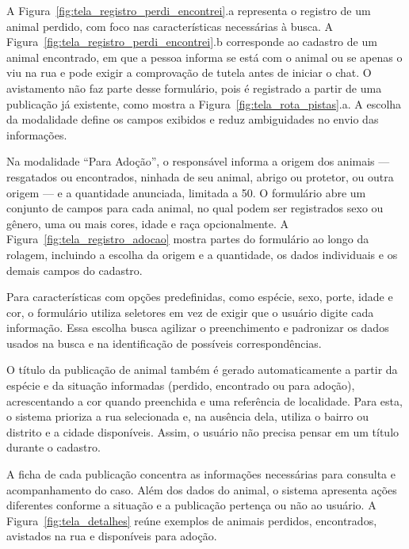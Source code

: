 A Figura~\ref{fig:tela_registro_perdi_encontrei}.a representa o registro de um animal perdido, com foco nas características necessárias à busca. A Figura~\ref{fig:tela_registro_perdi_encontrei}.b corresponde ao cadastro de um animal encontrado, em que a pessoa informa se está com o animal ou se apenas o viu na rua e pode exigir a comprovação de tutela antes de iniciar o chat. O avistamento não faz parte desse formulário, pois é registrado a partir de uma publicação já existente, como mostra a Figura~\ref{fig:tela_rota_pistas}.a. A escolha da modalidade define os campos exibidos e reduz ambiguidades no envio das informações.

Na modalidade ``Para Adoção'', o responsável informa a origem dos animais — resgatados ou encontrados, ninhada de seu animal, abrigo ou protetor, ou outra origem — e a quantidade anunciada, limitada a 50. O formulário abre um conjunto de campos para cada animal, no qual podem ser registrados sexo ou gênero, uma ou mais cores, idade e raça opcionalmente. A Figura~\ref{fig:tela_registro_adocao} mostra partes do formulário ao longo da rolagem, incluindo a escolha da origem e a quantidade, os dados individuais e os demais campos do cadastro.

Para características com opções predefinidas, como espécie, sexo, porte, idade e cor, o formulário utiliza seletores em vez de exigir que o usuário digite cada informação. Essa escolha busca agilizar o preenchimento e padronizar os dados usados na busca e na identificação de possíveis correspondências.

O título da publicação de animal também é gerado automaticamente a partir da espécie e da situação informadas (perdido, encontrado ou para adoção), acrescentando a cor quando preenchida e uma referência de localidade. Para esta, o sistema prioriza a rua selecionada e, na ausência dela, utiliza o bairro ou distrito e a cidade disponíveis. Assim, o usuário não precisa pensar em um título durante o cadastro.

A ficha de cada publicação concentra as informações necessárias para consulta e acompanhamento do caso. Além dos dados do animal, o sistema apresenta ações diferentes conforme a situação e a publicação pertença ou não ao usuário. A Figura~\ref{fig:tela_detalhes} reúne exemplos de animais perdidos, encontrados, avistados na rua e disponíveis para adoção.

